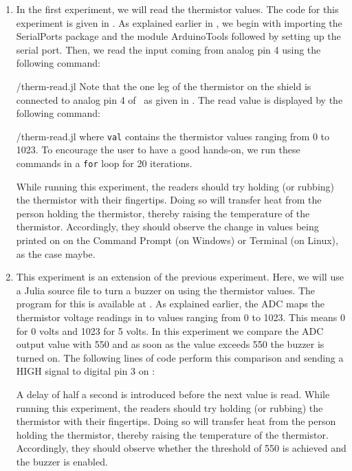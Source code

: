 \begin{enumerate}
  \item In the first experiment, we will read the thermistor values.
        The code for this experiment is given in
        . As explained earlier in , we begin with importing the SerialPorts
        \cite{julia-serial-ports} package and the module ArduinoTools followed by setting up the serial port.
        Then, we read the input coming from analog pin 4 using the
        following command:
        
        {\LocTHERMjuliacode/therm-read.jl} Note that the one leg of the thermistor on
        the shield is connected to analog pin 4 of \arduino\,
        as given in . The read value is displayed
        by the following command:
        
        {\LocTHERMjuliacode/therm-read.jl} where {\tt val} contains
        the thermistor values ranging from 0 to 1023. To
        encourage the user to have a good hands-on, we run these commands in
        a {\tt for} loop for 20 iterations.

        While running this experiment,
        the readers should try holding (or rubbing) the thermistor with their fingertips.
        Doing so will transfer heat from the person holding the
        thermistor, thereby raising the temperature of the thermistor.
        Accordingly, they should observe the change in values being printed on on the
        Command Prompt (on Windows) or Terminal (on Linux), as the case maybe.

  \item This experiment is an extension of the previous
        experiment. Here, we will use a Julia source file to
        turn a buzzer on using the thermistor values.
        The program for this is available at
        .  As explained earlier,
        the ADC maps the thermistor voltage readings in to values
        ranging from 0 to 1023. This means 0 for 0 volts and 1023 for 5
        volts. In this experiment we compare the ADC output value with 550
        and as soon as the value exceeds 550 the buzzer is turned on. The following lines of code perform this
        comparison and sending a {HIGH} signal to digital pin 3 on \arduino:
        
        A delay of half a second is introduced
        before the next value is read. While running this experiment,
        the readers should try holding (or rubbing) the thermistor with their fingertips.
        Doing so will transfer heat from the person holding the
        thermistor, thereby raising the temperature of the thermistor.
        Accordingly, they should observe whether the threshold of 550 is achieved
        and the buzzer is enabled.


\end{enumerate}
